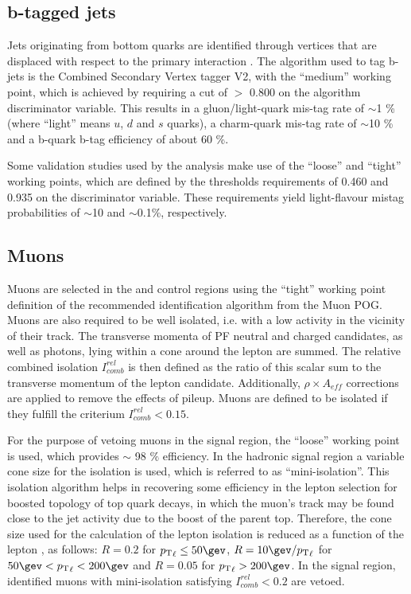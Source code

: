 \subsection{b-tagged jets}
\label{sec:btags}

Jets originating from bottom quarks are identified through vertices
that are displaced with respect to the primary interaction
\cite{Chatrchyan:2012jua}.  The algorithm used to tag b-jets is the
Combined Secondary Vertex tagger V2, with the ``medium'' working
point, which is achieved by requiring a cut of $>$ 0.800 on the
algorithm discriminator variable.  This results in a gluon/light-quark
mis-tag rate of $\sim$1 \% (where ``light'' means $u$, $d$ and $s$
quarks), a charm-quark mis-tag rate of $\sim$10 \% and a b-quark b-tag
efficiency of about 60 \%.

Some validation studies used by the analysis make use of the ``loose''
and ``tight'' working points, which are defined by the thresholds
requirements of 0.460 and 0.935 on the discriminator variable. These
requirements yield light-flavour mistag probabilities of $\sim$10 and
$\sim$0.1\%, respectively.

\subsection{Muons}
\label{sec:muon-id}

Muons are selected in the \mj and \mmj control regions using the
``tight'' working point definition of the recommended identification
algorithm from the Muon POG.  Muons are also required to be well
isolated, i.e. with a low activity in the vicinity of their track.
The transverse momenta of PF neutral and charged candidates, as well
as photons, lying within a cone around the lepton are summed.  The
relative combined isolation $I^{rel}_{comb}$ is then defined as the
ratio of this scalar sum to the transverse momentum of the lepton
candidate. Additionally, $\rho\times A_{eff}$ corrections are applied
to remove the effects of pileup.  Muons are defined to be isolated if
they fulfill the criterium $I^{rel}_{comb} < 0.15$.

For the purpose of vetoing muons in the signal region, the ``loose''
working point is used, which provides $\sim$ 98 $\%$ efficiency.  In
the hadronic signal region a variable cone size for the isolation is
used, which is referred to as ``mini-isolation''.  This isolation
algorithm helps in recovering some efficiency in the lepton selection
for boosted topology of top quark decays, in which the muon's track
may be found close to the jet activity due to the boost of the parent
top.  Therefore, the cone size used for the calculation of the lepton
isolation is reduced as a function of the lepton \Pt, as follows:
$R=0.2$ for $\Pt_{\ell}\leq50\gev$, $R=10\gev/\Pt_{\ell}$ for $50 \gev
< \Pt_{\ell} < 200\gev$ and $R=0.05$ for $\Pt_{\ell} > 200 \gev$.  In
the signal region, identified muons with mini-isolation satisfying
$I^{rel}_{comb} < 0.2$ are vetoed.

